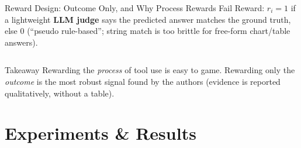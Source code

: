 \documentclass[aspectratio=169]{beamer}
\begin{document}
\begin{frame}{Reward Design: Outcome Only, and Why Process Rewards Fail}
  \small
  Reward: $r_i = 1$ if a lightweight \textbf{LLM judge} says the predicted answer matches the ground
  truth, else $0$ (``pseudo rule-based''; string match is too brittle for free-form chart/table answers).
  \vspace{0.3cm}
  \begin{columns}[T]
  \end{columns}
  \vspace{0.4cm}
  \begin{alertblock}{Takeaway}
    Rewarding the \emph{process} of tool use is easy to game. Rewarding only the \emph{outcome}
    is the most robust signal found by the authors (evidence is reported qualitatively, without a table).
  \end{alertblock}
\end{frame}

\section{Experiments \& Results}
\end{document}
